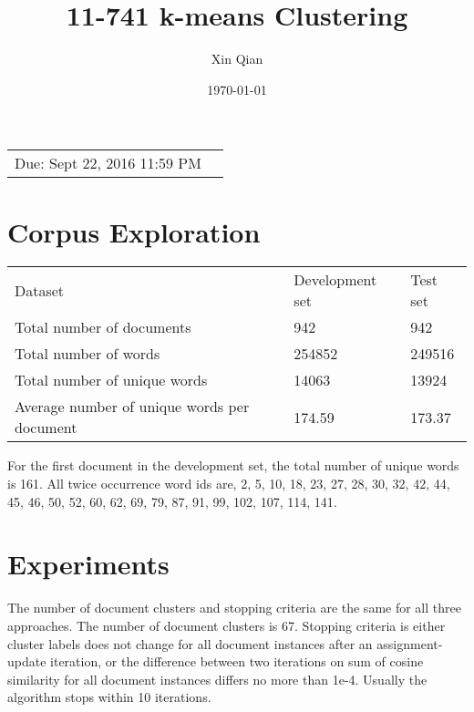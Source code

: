 \documentclass{article}
\title{11-741 k-means Clustering} %
\author{Xin Qian} %
\date{\today} %
\begin{document}
\maketitle %

\begin{center}
\begin{tabular}{l r}
Due: Sept 22, 2016 11:59 PM\end{tabular}
\end{center}



\section{Corpus Exploration}
\begin{center}
\begin{tabular}{lll}
Dataset & Development set & Test set \\
Total number of documents & 942 & 942 \\
Total number of words & 254852 &249516\\
Total number of unique words& 14063&13924\\
Average number of unique words per document & 174.59&173.37
\end{tabular}
\end{center}

For the first document in the development set, the total number of unique words is 161. All twice occurrence word ids are,
2, 5, 10, 18, 23, 27, 28, 30, 32, 42, 44, 45, 46, 50, 52, 60, 62, 69, 79, 87, 91, 99, 102, 107, 114, 141.\\

\section{Experiments}
The number of document clusters and stopping criteria are the same for all three approaches. The number of document clusters is 67. Stopping criteria is either cluster labels does not change for all document instances after an assignment-update iteration, or the difference between two iterations on sum of cosine similarity for all document instances differs no more than 1e-4. Usually the algorithm stops within 10 iterations.
\end{document}
